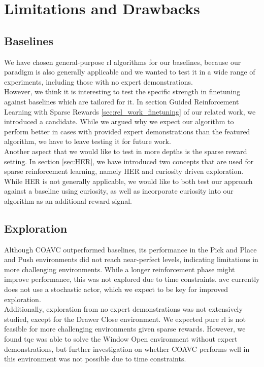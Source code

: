 \section{Limitations and Drawbacks}
\subsection{Baselines}
We have chosen general-purpose \ac{rl} algorithms for our baselines, because our paradigm is also generally applicable 
and we wanted to test it in a wide range of experiments, including those with no expert demonstrations.\\ 

However, we think it is interesting to test the specific strength in finetuning against baselines which are 
tailored for it. In section Guided Reinforcement Learning with Sparse Rewards \ref{sec:rel_work_finetuning} of our related work, we introduced 
a candidate. While we argued why we expect our algorithm to perform better in cases with provided expert demonstrations than the featured algorithm, we have to 
leave testing it for future work.\\

Another aspect that we would like to test in more depths is the sparse reward setting. In section \ref{sec:HER}, we have introduced two concepts that are used for sparse reinforcement learning, namely 
HER and curiosity driven exploration. While HER is not generally applicable, we would like to both test our approach against a baseline using curiosity, as well as incorporate 
curiosity into our algorithm as an additional reward signal. 

\subsection{Exploration}
Although COAVC outperformed baselines, its performance in the Pick and Place and Push environments did not reach near-perfect levels, 
indicating limitations in more challenging environments. While a longer reinforcement phase might improve performance, this was not explored 
due to time constraints. \ac{avc} currently does not use a stochastic actor, which we expect to be key for improved exploration.\\ 

Additionally, exploration from no expert demonstrations was not extensively studied, except for the Drawer Close 
environment. We expected pure \ac{rl} is not feasible for more challenging environments given sparse rewards. 
However, we found \ac{tqc} was able to solve the Window Open environment without expert demonstrations, but further investigation on whether 
COAVC performs well in this environment was not possible due to time constraints.\\ 


